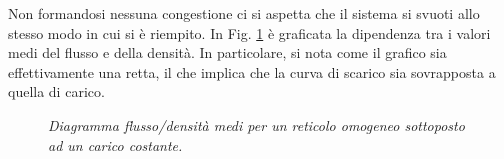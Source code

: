 \documentclass[../main.tex]{subfiles}
\begin{document}
Non formandosi nessuna congestione ci si aspetta che il sistema si svuoti allo stesso modo in cui si \`e riempito.
In Fig. \ref{fig:hysteresys_constant_homo} \`e graficata la dipendenza tra i valori medi del flusso e della densit\`a.
In particolare, si nota come il grafico sia effettivamente una retta, il che implica che la curva di scarico sia sovrapposta a quella di carico.
\begin{figure}[H]
    \centering
    \caption[Diagramma flusso/densit\`a medi per un reticolo omogeneo sottoposto ad un carico costante.]{\emph{Diagramma flusso/densit\`a medi per un reticolo omogeneo sottoposto ad un carico costante.}}
    \label{fig:hysteresys_constant_homo}
\end{figure}
\end{document}
